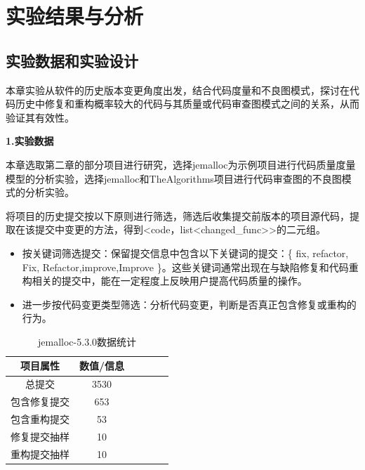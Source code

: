 
\section{实验结果与分析}

\subsection{实验数据和实验设计}

本章实验从软件的历史版本变更角度出发，结合代码度量和不良图模式，探讨在代码历史中修复和重构概率较大的代码与其质量或代码审查图模式之间的关系，从而验证其有效性。

\noindent \textbf{1.实验数据}

本章选取第二章的部分项目进行研究，选择jemalloc为示例项目进行代码质量度量模型的分析实验，选择jemalloc和TheAlgorithms项目进行代码审查图的不良图模式的分析实验。

将项目的历史提交按以下原则进行筛选，筛选后收集提交前版本的项目源代码，提取在该提交中变更的方法，得到<code，list<changed\_func>>的二元组。

\begin{itemize}
    \item 按关键词筛选提交：保留提交信息中包含以下关键词的提交：\{ fix, refactor, Fix, Refactor,improve,Improve \}。这些关键词通常出现在与缺陷修复和代码重构相关的提交中，能在一定程度上反映用户提高代码质量的操作。
    \item 进一步按代码变更类型筛选：分析代码变更，判断是否真正包含修复或重构的行为。
\end{itemize}

\begin{table}[htbp]
\caption{jemalloc-5.3.0数据统计}
\vspace{0.5em}\centering\wuhao
\begin{tabular}{cccccc}
\toprule
项目属性 & 数值/信息 \\
\midrule
总提交 & 3530 \\
包含修复提交 & 653  \\
包含重构提交 & 53  \\
修复提交抽样 & 10 \\
重构提交抽样 &  10 \\
\bottomrule
\end{tabular}
\end{table}

